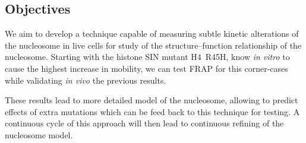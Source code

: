   \subsection{Objectives}

    We aim to develop a technique capable of measuring subtle kinetic
    alterations of the nucleosome in live cells for study of the
    structure--function relationship of the nucleosome.
    Starting with the histone SIN mutant H4~R45H, know \textit{in vitro} to
    cause the highest increase in mobility, we can test FRAP for this
    corner-cases while validating \textit{in vivo} the previous results.

    These results lead to more detailed model of the nucleosome, allowing
    to predict effects of extra mutations which can be feed back to this
    technique for testing. A continuous cycle of this approach will then lead
    to continuous refining of the nucleosome model.

